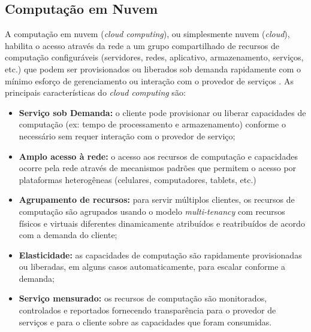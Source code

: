 

\subsection{Computação em Nuvem}

A computação em nuvem (\emph{cloud computing}), ou simplesmente nuvem
(\emph{cloud}), habilita o acesso através da rede a um grupo compartilhado de
recursos de computação configuráveis (servidores, redes, aplicativo,
armazenamento, serviços, etc.) que podem ser provisionados ou liberados sob
demanda rapidamente com o mínimo esforço de gerenciamento ou interação com o
provedor de serviços \cite{NIST2011}. As principais características do
\emph{cloud computing} são:


\begin{itemize}
    
    \item \textbf{Serviço sob Demanda:} o cliente pode provisionar ou liberar
    capacidades de computação (ex: tempo de processamento e armazenamento) conforme o
    necessário sem requer interação com o provedor de serviço;
    
    \item \textbf{Amplo acesso à rede:} o acesso aos recursos de computação e
    capacidades ocorre pela rede através de mecanismos padrões que permitem o
    acesso por plataformas heterogêneas (celulares, computadores, tablets, etc.)
      
    \item \textbf{Agrupamento de recursos:} para servir múltiplos clientes, os
    recursos de computação são agrupados usando o modelo \emph{multi-tenancy}
    com recursos físicos e virtuais diferentes dinamicamente atribuídos e
    reatribuídos de acordo com a demanda do cliente;
    
    \item \textbf{Elasticidade:} as capacidades de computação são rapidamente
    provisionadas ou liberadas, em alguns casos automaticamente, para escalar
    conforme a demanda;
    
    \item \textbf{Serviço mensurado:} os recursos de computação são monitorados,
    controlados e reportados fornecendo transparência para o provedor de
    serviços e para o cliente sobre as capacidades que foram consumidas.

\end{itemize}

